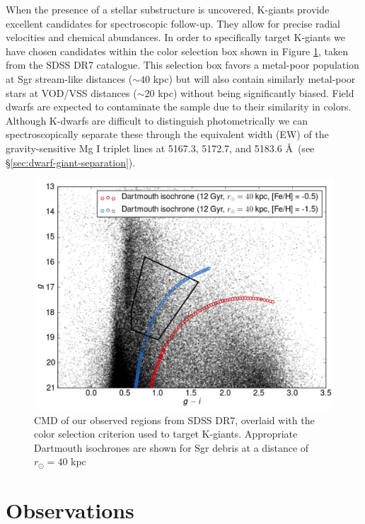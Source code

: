 \documentclass[preprint2]{aastex}
\begin{document}
When the presence of a stellar substructure is uncovered, K-giants provide excellent candidates for spectroscopic follow-up. They allow for precise radial velocities and chemical abundances. In order to specifically target K-giants we have chosen candidates within the color selection box shown in Figure \ref{fig:cmd-target-selection}, taken from the SDSS DR7 catalogue. This selection box favors a metal-poor population at Sgr stream-like distances ($\sim40$ kpc) but will also contain similarly metal-poor stars at VOD/VSS distances ($\sim20$ kpc) without being significantly biased. Field dwarfs are expected to contaminate the sample due to their similarity in colors. Although K-dwarfs are difficult to distinguish photometrically we can spectroscopically separate these through the equivalent width (EW) of the  gravity-sensitive Mg I triplet lines at 5167.3, 5172.7, and 5183.6 \AA\ (see \S\ref{sec:dwarf-giant-separation}).

\begin{figure}[h]
	\includegraphics[width=\columnwidth]{./cmd.eps}
	\caption{CMD of our observed regions from SDSS DR7, overlaid with the color selection criterion used to target K-giants. Appropriate Dartmouth isochrones \citep{Dotter;et-al_2008} are shown for Sgr debris at a distance of $r_\odot =40$ kpc \citep{Belokurov;et-al_2006}}
	\label{fig:cmd-target-selection}
\end{figure}

\section{Observations}
\label{sec:observations}
\end{document}
